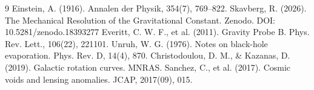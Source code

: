\documentclass[12pt,a4paper]{article}
\begin{document}
\begin{thebibliography}{9}
 Einstein, A. (1916). Annalen der Physik, 354(7), 769--822.
 Skavberg, R. (2026). The Mechanical Resolution of the Gravitational Constant. Zenodo. DOI: 10.5281/zenodo.18393277
 Everitt, C. W. F., et al. (2011). Gravity Probe B. Phys. Rev. Lett., 106(22), 221101.
 Unruh, W. G. (1976). Notes on black-hole evaporation. Phys. Rev. D, 14(4), 870.
 Christodoulou, D. M., \& Kazanas, D. (2019). Galactic rotation curves. MNRAS.
 Sanchez, C., et al. (2017). Cosmic voids and lensing anomalies. JCAP, 2017(09), 015.
\end{thebibliography}
\end{document}
